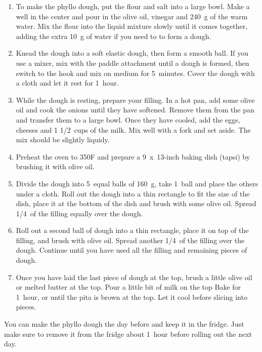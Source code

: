 \begin{enumerate}
    \item To make the phyllo dough, put the flour and salt into a large bowl. Make a well in the center and pour in the olive oil, vinegar and 240~g of the warm water. Mix the flour into the liquid mixture slowly until it comes together, adding the extra 10~g of water if you need to to form a dough.
    \item Knead the dough into a soft elastic dough, then form a smooth ball. If you use a mixer, mix with the paddle attachment until a dough is formed, then switch to the hook and mix on medium for 5~minutes. Cover the dough with a cloth and let it rest for 1~hour.
    \item While the dough is resting, prepare your filling. In a hot pan, add some olive oil and cook the onions until they have softened. Remove them from the pan and transfer them to a large bowl. Once they have cooled, add the eggs, cheeses and 1 1/2~cups of the milk. Mix well with a fork and set aside. The mix should be slightly liquidy.
    \item Preheat the oven to 350\degree F and prepare a 9~x~13-inch baking dish (tapsi) by brushing it with olive oil.
    \item Divide the dough into 5~equal balls of 160~g, take 1~ball and place the others under a cloth. Roll out the dough into a thin rectangle to fit the size of the dish, place it at the bottom of the dish and brush with some olive oil. Spread 1/4~of the filling equally over the dough.
    \item Roll out a second ball of dough into a thin rectangle, place it on top of the filling, and brush with olive oil. Spread another 1/4~of the filling over the dough. Continue until you have used all the filling and remaining pieces of dough.
    \item Once you have laid the last piece of dough at the top, brush a little olive oil or melted butter at the top. Pour a little bit of milk on the top
    Bake for 1~hour, or until the pita is brown at the top. Let it cool before slicing into pieces.
\end{enumerate}

You can make the phyllo dough the day before and keep it in the fridge. Just make sure to remove it from the fridge about 1~hour before rolling out the next day.


